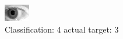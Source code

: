 \begin{figure}[h!]
\begin{center}
\includegraphics[width=0.60\columnwidth]{figures/ID304_class_4_target_3.png}
\end{center}
\caption{ Classification: 4 actual target: 3}
\label{fig:ID304_class_4_target_3}
\end{figure}
